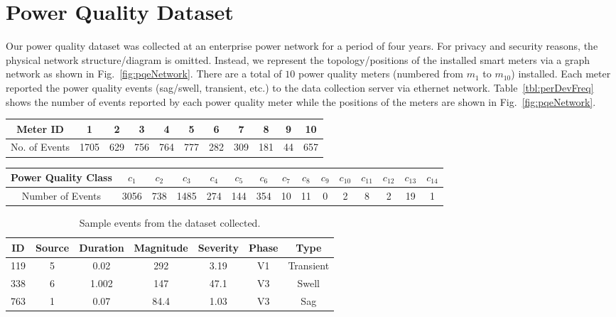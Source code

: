 \section{Power Quality Dataset}
Our power quality dataset was collected at an enterprise power network for a period of four years. For privacy and security reasons, the physical network structure/diagram is omitted. Instead, we represent the topology/positions of the installed smart meters via a graph network as shown in Fig.~\ref{fig:pqeNetwork}. There are a total of $10$ power quality meters (numbered from $m_1$ to $m_{10}$) installed. Each meter reported the power quality events (sag/swell, transient, etc.) to the data collection server via ethernet network. Table~\ref{tbl:perDevFreq} shows the number of events reported by each power quality meter while the positions of the meters are shown in Fig.~\ref{fig:pqeNetwork}.

\begin{table*}[!t]
\caption{Frequency table showing the number of events generated/reported by each power quality meter.}
\centering 
\renewcommand{\tabcolsep}{0.15cm}
\begin{tabular}{|c|c|c|c|c|c|c|c|c|c|c|}
\hline Meter ID & 1 & 2 & 3 & 4 & 5 & 6 & 7 & 8 & 9 & 10\tabularnewline
\hline No. of Events & 1705 & 629 & 756 & 764 & 777 & 282 & 309 & 181 & 44 & 657\tabularnewline
\hline 
\end{tabular}
\label{tbl:perDevFreq}
\end{table*}

\begin{table*}[!t]
\caption{Frequency table showing the number of events classified as IEEE power quality class ($c_i$).}
\centering 
\renewcommand{\tabcolsep}{0.12cm}
\begin{tabular}{|c|c|c|c|c|c|c|c|c|c|c|c|c|c|c|}
\hline Power Quality Class & $c_1$ & $c_2$ & $c_3$ & $c_4$ & $c_5$ & $c_6$ & $c_7$ & $c_8$ & $c_9$ & $c_{10}$ & $c_{11}$ & $c_{12}$ & $c_{13}$ & $c_{14}$\tabularnewline
\hline Number of Events & 3056 & 738 & 1485 & 274 & 144 & 354 & 10 & 11 & 0 & 2 & 8 & 2 & 19 & 1\tabularnewline
\hline 
\end{tabular}
\label{tbl:perClassFreq}
\end{table*}

\begin{table}[!t]
\caption{Sample events from the dataset collected.}
\centering 
\renewcommand{\tabcolsep}{0.15cm}
\begin{tabular}{|c|c|c|c|c|c|c|}
\hline ID & Source & Duration & Magnitude & Severity & Phase  & Type\tabularnewline
\hline 119 & 5 & 0.02 & 292	& 3.19 & V1 & Transient\tabularnewline
 338 & 6 & 1.002 & 147 & 47.1 & V3 & Swell\tabularnewline
 763 & 1 & 0.07 & 84.4 & 1.03 & V3 & Sag\tabularnewline
\hline 
\end{tabular}
\label{tbl:sampleData}
\end{table}

